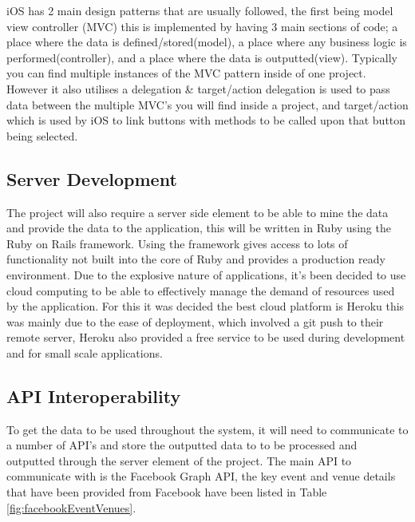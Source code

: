 	iOS has 2 main design patterns that are usually followed, the first being model view controller (MVC) this is implemented by having 3 main sections of code; a place where the data is defined/stored(model), a place where any business logic is performed(controller), and a place where the data is outputted(view). Typically you can find multiple instances of the MVC pattern inside of one project. However it also utilises a delegation \& target/action delegation is used to pass data between the multiple MVC's you will find inside a project, and target/action which is used by iOS to link buttons with methods to be called upon that button being selected.

	\subsection{Server Development}

	The project will also require a server side element to be able to mine the data and provide the data to the application, this will be written in Ruby using the Ruby on Rails framework. Using the framework gives access to lots of functionality not built into the core of Ruby and provides a production ready environment. Due to the explosive nature of applications, it's been decided to use cloud computing to be able to effectively manage the demand of resources used by the application. For this it was decided the best cloud platform is Heroku\cite{heroku} this was mainly due to the ease of deployment, which involved a git push to their remote server, Heroku also provided a free service to be used during development and for small scale applications. 


	\subsection{API Interoperability}
		To get the data to be used throughout the system, it will need to communicate to a number of API's and store the outputted data to to be processed and outputted through the server element of the project. The main API to communicate with is the Facebook Graph API\cite{facebookapi}, the key event and venue details that have been provided from Facebook have been listed in Table \ref{fig:facebookEventVenues}. 
		
